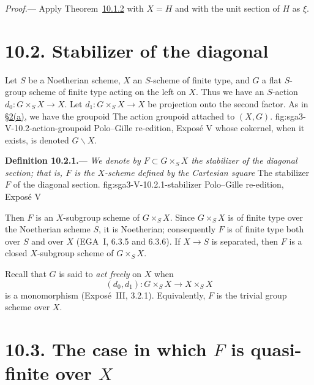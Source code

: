 \medskip
\noindent\textit{Proof.}---
Apply Theorem~\hyperref[thm:sga3-V-10.1.2]{10.1.2} with \(X=H\) and
with the unit section of \(H\) as \(\xi\).

\section*{10.2. Stabilizer of the diagonal}
\label{sec:sga3-V-10.2}

Let \(S\) be a Noetherian scheme, \(X\) an \(S\)-scheme of finite
type, and \(G\) a flat \(S\)-group scheme of finite type acting on the
left on \(X\). Thus we have an \(S\)-action
\(d_0:G\times_SX\to X\). Let \(d_1:G\times_SX\to X\) be projection
onto the second factor. As in \hyperref[par:sga3-V-2-a]{\S2(a)}, we have the groupoid
  {The action groupoid attached to \((X,G)\).}
  {fig:sga3-V-10.2-action-groupoid}
  {Polo--Gille re-edition, Expos\'e V}
whose cokernel, when it exists, is denoted \(G\backslash X\).

\medskip
{}\label{def:sga3-V-10.2.1}%
\noindent\textbf{Definition 10.2.1.}---
\textit{We denote by \(F\subset G\times_SX\) the \emph{stabilizer of
the diagonal section}; that is, \(F\) is the \(X\)-scheme defined by
the Cartesian square}
  {The stabilizer \(F\) of the diagonal section.}
  {fig:sga3-V-10.2.1-stabilizer}
  {Polo--Gille re-edition, Expos\'e V}

Then \(F\) is an \(X\)-subgroup scheme of \(G\times_SX\). Since
\(G\times_SX\) is of finite type over the Noetherian scheme \(S\), it
is Noetherian; consequently \(F\) is of finite type both over \(S\)
and over \(X\) (EGA~I, 6.3.5 and 6.3.6). If \(X\to S\) is separated,
then \(F\) is a closed \(X\)-subgroup scheme of \(G\times_SX\).

Recall that \(G\) is said to \emph{act freely} on \(X\) when
\[
  (d_0,d_1):G\times_SX\longrightarrow X\times_SX
\]
is a monomorphism (Expos\'e~III, 3.2.1). Equivalently, \(F\) is the
trivial group scheme over \(X\).

\section*{10.3. The case in which \(F\) is quasi-finite over \(X\)}
\label{sec:sga3-V-10.3}

